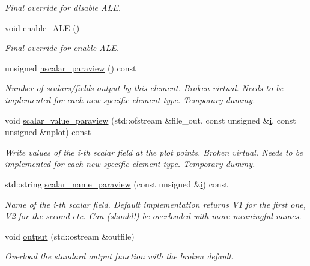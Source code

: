 \begin{DoxyCompactItemize}
\begin{DoxyCompactList}\small\item\em Final override for disable A\+LE. \end{DoxyCompactList}\item 
void \hyperlink{classoomph_1_1BuoyantQCrouzeixRaviartElement_af551bb70aa118a8db4498f41272fe776}{enable\+\_\+\+A\+LE} ()
\begin{DoxyCompactList}\small\item\em Final override for enable A\+LE. \end{DoxyCompactList}\item 
unsigned \hyperlink{classoomph_1_1BuoyantQCrouzeixRaviartElement_a5103e49416e1a0e36a2e8e117fb78623}{nscalar\+\_\+paraview} () const
\begin{DoxyCompactList}\small\item\em Number of scalars/fields output by this element. Broken virtual. Needs to be implemented for each new specific element type. Temporary dummy. \end{DoxyCompactList}\item 
void \hyperlink{classoomph_1_1BuoyantQCrouzeixRaviartElement_a33130eacdbdee41536fce76166c4a769}{scalar\+\_\+value\+\_\+paraview} (std\+::ofstream \&file\+\_\+out, const unsigned \&\hyperlink{cfortran_8h_adb50e893b86b3e55e751a42eab3cba82}{i}, const unsigned \&nplot) const
\begin{DoxyCompactList}\small\item\em Write values of the i-\/th scalar field at the plot points. Broken virtual. Needs to be implemented for each new specific element type. Temporary dummy. \end{DoxyCompactList}\item 
std\+::string \hyperlink{classoomph_1_1BuoyantQCrouzeixRaviartElement_a26f8112d2ba9c77087e534145a2477c9}{scalar\+\_\+name\+\_\+paraview} (const unsigned \&\hyperlink{cfortran_8h_adb50e893b86b3e55e751a42eab3cba82}{i}) const
\begin{DoxyCompactList}\small\item\em Name of the i-\/th scalar field. Default implementation returns V1 for the first one, V2 for the second etc. Can (should!) be overloaded with more meaningful names. \end{DoxyCompactList}\item 
void \hyperlink{classoomph_1_1BuoyantQCrouzeixRaviartElement_a3817706dbf3c755b4029917dac80bad7}{output} (std\+::ostream \&outfile)
\begin{DoxyCompactList}\small\item\em Overload the standard output function with the broken default. \end{DoxyCompactList}\item 

\end{DoxyCompactItemize}
